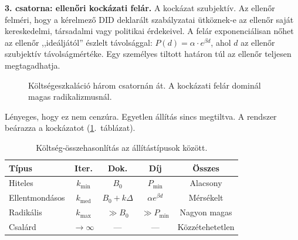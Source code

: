 \documentclass[11pt,a4paper,twocolumn]{article}
\begin{document}
\textbf{3. csatorna: ellenőri kockázati felár.} A kockázat szubjektív. Az ellenőr felméri, hogy a kérelmező DID deklarált szabályzatai ütköznek-e az ellenőr saját kereskedelmi, társadalmi vagy politikai érdekeivel. A felár exponenciálisan nőhet az ellenőr ,,ideáljától'' észlelt távolsággal: $P(d) = \alpha \cdot e^{\beta d}$, ahol $d$ az ellenőr szubjektív távolságmértéke. Egy személyes tiltott határon túl az ellenőr teljesen megtagadhatja.

\begin{figure}[ht]
\centering
{}
\caption{Költségeszkaláció három csatornán át. A kockázati felár dominál magas radikalizmusnál.}
\label{fig:radicalism}
\end{figure}

Lényeges, hogy ez nem cenzúra. Egyetlen állítás sincs megtiltva. A rendszer beárazza a kockázatot (\ref{tab:costs}.~táblázat).

\begin{table}[ht]
\centering
\caption{Költség-összehasonlítás az állítástípusok között.}
\label{tab:costs}
\footnotesize
\begin{tabular}{@{}lcccc@{}}
\toprule
\textbf{Típus} & \textbf{Iter.} & \textbf{Dok.} & \textbf{Díj} & \textbf{Összes} \\
\midrule
Hiteles & $k_{\min}$ & $B_0$ & $P_{\min}$ & Alacsony \\
Ellentmondásos & $k_{\text{med}}$ & $B_0{+}k\Delta$ & $\alpha e^{\beta d}$ & Mérsékelt \\
Radikális & $k_{\max}$ & $\gg B_0$ & $\gg P_{\min}$ & Nagyon magas \\
Csalárd & $\to\infty$ & --- & --- & Közzétehetetlen \\
\bottomrule
\end{tabular}
\end{table}
\end{document}
